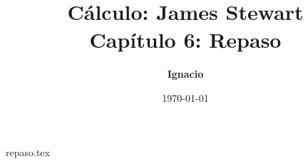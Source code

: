 \documentclass[11pt,spanish,oneside]{report}
\title{\textbf{Cálculo: James Stewart} \\ \Large Capítulo 6: Repaso}
\author{\textbf{Ignacio}}
\date{\today}
\begin{document}
\maketitle

{repaso.tex}
\end{document}
